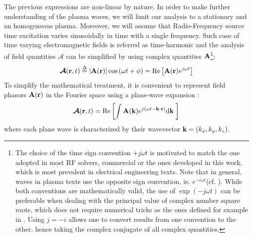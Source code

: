 The previous expressions are non-linear by nature. In order to make further understanding of the plasma waves, we will limit our analysis to a stationary and an homogeneous plasma. Moreover, we will assume that Radio-Frequency source time excitation varies sinusoidally in time with a single frequency. Such case of time varying electromagnetic fields is referred as time-harmonic   and the analysis of field quantities $\boldsymbol{\mathcal{A}}$ can be simplified by using complex quantities ${\mathbf A}$\footnote{The choice of the time sign convention $+j\omega t$ is motivated to match the one adopted in most RF solvers, commercial or the ones developed in this work, which is most prevalent in electrical engineering texts. Note that in general, waves in plasma texts use the opposite sign convention, ie. $e^{-i\omega t}$(cf. ). While both conventions are mathematically valid, the use of $\exp(-j\omega t)$ can be preferable when dealing with the principal value of complex number square roots, which does not require numerical tricks as the ones defined for example in . Using $j=-i$ allows one to convert results from one convention to the other, hence taking the complex conjugate of all complex quantities.}:
\begin{equation}
\boldsymbol{\mathcal{A}}({\mathbf r},t) 
	\stackrel{\Delta}{=} 
	\left| {\mathbf A}({\mathbf r}) \right| \cos\left(\omega t + \phi \right) 
	= 
	\Re \left[ {\mathbf A}({\mathbf r}) e^{j\omega t} \right]
\end{equation}
To simplify the mathematical treatment, it is convenient to represent field phasors ${\mathbf A}(\mathbf{r})$ in the Fourier space using a plane-wave expansion : 
\begin{equation}
		\boldsymbol{\mathcal{A}}(\mathbf{r}, t) 
		=
		\Re \left[
		\int 
		\mathbf{A}({\mathbf k}) e^{j(\omega t - {\mathbf k}\cdot{\mathbf r})}
		{\mathrm{d}} {\mathbf k} \;
		\right]
	\label{eq:k-spectralDefinition}
\end{equation}
where each plane wave is characterized by their wavevector ${\mathbf k}=(k_x, k_y, k_z)$. 


